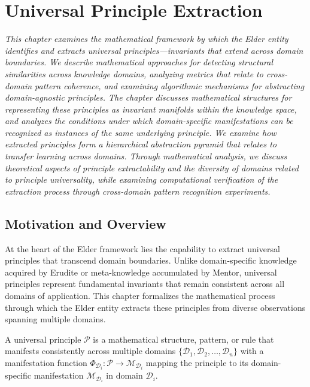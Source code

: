 \chapter{Universal Principle Extraction}

\textit{This chapter examines the mathematical framework by which the Elder entity identifies and extracts universal principles—invariants that extend across domain boundaries. We describe mathematical approaches for detecting structural similarities across knowledge domains, analyzing metrics that relate to cross-domain pattern coherence, and examining algorithmic mechanisms for abstracting domain-agnostic principles. The chapter discusses mathematical structures for representing these principles as invariant manifolds within the knowledge space, and analyzes the conditions under which domain-specific manifestations can be recognized as instances of the same underlying principle. We examine how extracted principles form a hierarchical abstraction pyramid that relates to transfer learning across domains. Through mathematical analysis, we discuss theoretical aspects of principle extractability and the diversity of domains related to principle universality, while examining computational verification of the extraction process through cross-domain pattern recognition experiments.}

\section{Motivation and Overview}

At the heart of the Elder framework lies the capability to extract universal principles that transcend domain boundaries. Unlike domain-specific knowledge acquired by Erudite or meta-knowledge accumulated by Mentor, universal principles represent fundamental invariants that remain consistent across all domains of application. This chapter formalizes the mathematical process through which the Elder entity extracts these principles from diverse observations spanning multiple domains.

\begin{definition}
A universal principle $\mathcal{P}$ is a mathematical structure, pattern, or rule that manifests consistently across multiple domains $\{\mathcal{D}_1, \mathcal{D}_2, \ldots, \mathcal{D}_n\}$ with a manifestation function $\Phi_{\mathcal{D}_i}: \mathcal{P} \rightarrow \mathcal{M}_{\mathcal{D}_i}$ mapping the principle to its domain-specific manifestation $\mathcal{M}_{\mathcal{D}_i}$ in domain $\mathcal{D}_i$.
\end{definition}

